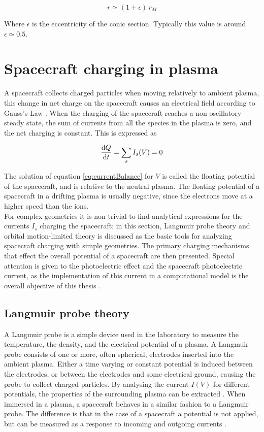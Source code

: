 \begin{equation}
    r \simeq (1 + \epsilon) \, r_M
\end{equation}

Where $\epsilon$ is the eccentricity of the conic section. Typically this value is around $\epsilon \simeq 0.5$.

\section{Spacecraft charging in plasma}
A spacecraft collects charged particles when moving relatively to ambient plasma, this change in net charge on the spacecraft causes an electrical field according to Gauss's Law . When the charging of the spacecraft reaches a non-oscillatory steady state, the sum of currents from all the species in the plasma is zero, and the net charging is constant. This is expressed as 

\begin{equation} \label{eq:currentBalance}
    \dv{Q}{t} = \sum_s I_s(V) = 0
\end{equation}

The solution of equation \ref{eq:currentBalance} for $V$ is called the floating potential of the spacecraft, and is relative to the neutral plasma. The floating potential of a spacecraft in a drifting plasma is usually negative, since the electrons move at a higher speed than the ions.
\\
For complex geometries it is non-trivial to find analytical expressions for the currents $I_s$ charging the spacecraft; in this section, Langmuir probe theory and orbital motion-limited theory is discussed as the basic tools for analyzing spacecraft charging with simple geometries. The primary charging mechanisms that effect the overall potential of a spacecraft are then presented. Special attention is given to the photoelectric effect and the spacecraft photoelectric current, as the implementation of this current in a computational model is the overall objective of this thesis .


\subsection{Langmuir probe theory}
A Langmuir probe is a simple device used in the laboratory to measure the temperature, the density, and the electrical potential of a plasma. A Langmuir probe consists of one or more, often spherical, electrodes inserted into the ambient plasma. Either a time varying or constant potential is induced between the electrodes, or between the electrodes and some electrical ground, causing the probe to collect charged particles. By analysing the current $I(V)$ for different potentials, the properties of the surrounding plasma can be extracted . When immersed in a plasma, a spacecraft behaves in a similar fashion to a Langmuir probe. The difference is that in the case of a spacecraft a potential is not applied, but can be measured as a response to incoming and outgoing currents . 


